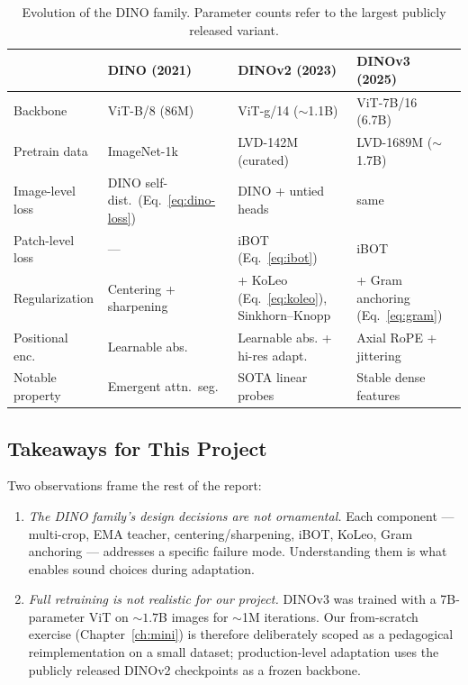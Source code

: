 \documentclass[11pt,a4paper]{article}
\begin{document}
\begin{table}[H]
\centering\small
\caption{Evolution of the DINO family. Parameter counts refer to the
largest publicly released variant.}
\label{tab:dino-evolution}
\begin{tabular}{@{}p{3.2cm}p{3.5cm}p{3.5cm}p{3.5cm}@{}}
\toprule
 & \textbf{DINO} (2021) & \textbf{DINOv2} (2023) & \textbf{DINOv3} (2025) \\
\midrule
Backbone & ViT-B/8 (86M) & ViT-g/14 ($\sim$1.1B) & ViT-7B/16 (6.7B) \\
Pretrain data & ImageNet-1k & LVD-142M (curated) & LVD-1689M ($\sim$1.7B) \\
Image-level loss & DINO self-dist.\ (Eq.~\ref{eq:dino-loss}) & DINO + untied heads & same \\
Patch-level loss & --- & iBOT (Eq.~\ref{eq:ibot}) & iBOT \\
Regularization & Centering + sharpening & + KoLeo (Eq.~\ref{eq:koleo}), Sinkhorn--Knopp & + Gram anchoring (Eq.~\ref{eq:gram}) \\
Positional enc.\ & Learnable abs. & Learnable abs. + hi-res adapt. & Axial RoPE + jittering \\
Notable property & Emergent attn.\ seg. & SOTA linear probes & Stable dense features \\
\bottomrule
\end{tabular}
\end{table}

\subsection{Takeaways for This Project}

Two observations frame the rest of the report:

\begin{enumerate}[leftmargin=*]
  \item \emph{The DINO family's design decisions are not ornamental.}
  Each component --- multi-crop, EMA teacher, centering/sharpening, iBOT,
  KoLeo, Gram anchoring --- addresses a specific failure mode. Understanding
  them is what enables sound choices during adaptation.
  \item \emph{Full retraining is not realistic for our project.}
  DINOv3 was trained with a 7B-parameter ViT on $\sim 1.7$B images for
  $\sim$1M iterations. Our from-scratch exercise (Chapter~\ref{ch:mini}) is therefore
  deliberately scoped as a pedagogical reimplementation on a small
  dataset; production-level adaptation uses the publicly released
  DINOv2 checkpoints as a frozen backbone.
\end{enumerate}
\end{document}
